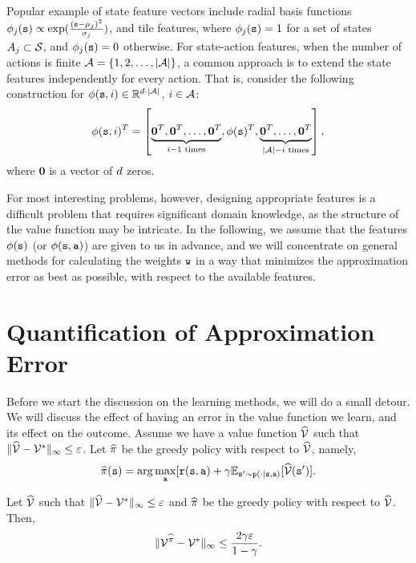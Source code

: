 Popular example of state feature vectors include radial basis functions $\phi_j({\tt s}) \propto \exp(\frac{({\tt s}-\mu_j)^2}{\sigma_j})$, and tile features, where $\phi_j({\tt s}) = 1$ for a set of states $A_j \subset \mathcal{S}$, and $\phi_j({\tt s}) = 0$ otherwise. For state-action features, when the number of actions is finite $\mathcal{A} = \left\{1,2,\dots,|\mathcal{A}|\right\}$, a common approach is to extend the state features independently for every action. That is, consider the following construction for $\phi({\tt s},i)\in \mathbb{R}^{d \cdot |\mathcal{A}|}$, $i\in \mathcal{A}$:
\begin{equation*}
    \phi({\tt s},i)^T = \left[ \underbrace{\mathbf{0}^T, \mathbf{0}^T, \dots, \mathbf{0}^T}_{i-1 \text{ times}}, \phi({\tt s})^T, \underbrace{\mathbf{0}^T, \dots, \mathbf{0}^T}_{|\mathcal{A}|-i \text{ times}}\right],
\end{equation*}
where $\mathbf{0}$ is a vector of $d$ zeros.

For most interesting problems, however, designing appropriate features is a difficult problem that requires significant domain knowledge, as the structure of the value function may be intricate. In the following, we assume that the features $\phi({\tt s})$ (or $\phi({\tt s},{\tt a})$) are given to us in advance, and we will concentrate on general methods for calculating the weights ${\tt w}$ in a way that minimizes the approximation error as best as possible, with respect to the available features. 

\section{Quantification of Approximation Error}

Before we start the discussion on the learning methods, we will do a
small detour. We will discuss the effect of having an error in the
value function we learn, and its effect on the outcome. Assume we
have a value function $\widehat{\mathcal{V}}$ such that $\|\widehat{\mathcal{V}}-\mathcal{V}^*\|_\infty\leq
\varepsilon$. Let $\widehat{\pi}$ be the greedy policy with respect to
$\widehat{\mathcal{V}}$, namely,
\[
\widehat{\pi}({\tt s})=\arg\max_{\tt a} [{\tt r}({\tt s},{\tt a})+\gamma
\mathbb{E}_{{\tt s}'\sim {\tt p}(\cdot|{\tt s},{\tt a})}[\widehat{\mathcal{V}}({\tt s}')].
\]


\begin{theorem}\label{thm:approx_error}
Let $\widehat{\mathcal{V}}$ such that $\|\widehat{\mathcal{V}}-\mathcal{V}^*\|_\infty\leq \varepsilon$ and
$\widehat{\pi}$ be the greedy policy with respect to $\widehat{\mathcal{V}}$. Then,
\[
\|\mathcal{V}^{\widehat{\pi}}-\mathcal{V}^*\|_\infty\leq\frac{2\gamma\varepsilon}{1-\gamma}.
\]
\end{theorem}

